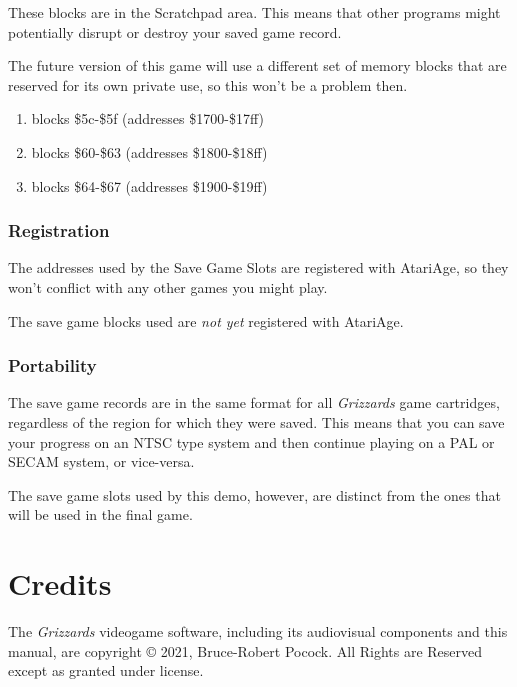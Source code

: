 \documentclass[12pt,openright,book]{memoir}
\begin{document}
\begin{description}
These blocks are in the Scratchpad  area. This means that other programs
might potentially disrupt or destroy your saved game record.

The  future version  of this  game will  use a  different set  of memory
blocks  that are  reserved for  its own  private use,  so this  won't be
a problem then.

\else

\begin{enumerate}
\item blocks \$5c-\$5f (addresses \$1700-\$17ff)
\item blocks \$60-\$63 (addresses \$1800-\$18ff)
\item blocks \$64-\$67 (addresses \$1900-\$19ff)
\end{enumerate}

\subsection{Registration}

\ifdefined\FIXMERegisterGameWithAtariAge

The addresses used by the Save  Game Slots are registered with AtariAge,
so they won't conflict with any other games you might play.

\else

The save game blocks used are \emph{not yet} registered with AtariAge.

\fi

\fi


\subsection{Portability}

The save game records are in the same format for all \textit{Grizzards} game
cartridges, regardless of the region for which they were saved.  This means
that you can save your progress on an NTSC type system and then continue
playing on a PAL or SECAM system, or vice-versa.

\ifdefined\DEMO

The save  game slots used by  this demo, however, are  distinct from the
ones that will be used in the final game.

\fi

\chapter{Credits}

The  \textit{Grizzards} videogame  software,  including its  audiovisual
components   and  this   manual,   are   copyright  \copyright{}   2021,
Bruce-Robert  Pocock.   All  Rights  are  Reserved   except  as  granted
under license.


\end{description}
\end{document}
